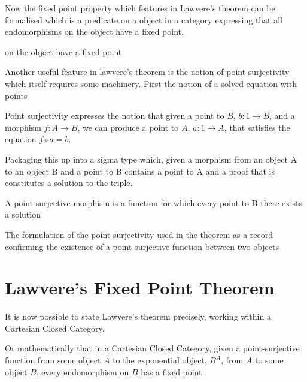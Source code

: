 
Now the fixed point property which features in Lawvere's theorem can be
formalised which is a predicate on a object in a category expressing that all
endomorphisms on the object have a fixed point.

 on the object have a fixed point.

Another useful feature in lawvere's theorem is the notion of point surjectivity
which itself requires some machinery. First the notion of a solved equation with
points


Point surjectivity expresses the notion that given a point to $B$, $b : 1
\rightarrow B$, and a morphism $f : A \rightarrow B$, we can produce a point to
$A$, $a : 1 \rightarrow A$, that satisfies the equation $f \circ a = b$.

Packaging this up into a sigma type which, given a morphism from an object A to
an object B and a point to B contains a point to A and a proof that is
constitutes a solution to the triple.


A point surjective morphism is a function for which every point to B there
exists a solution


The formulation of the point surjectivity used in the theorem as a record
confirming the existence of a point surjective function between two objects


\section{Lawvere's Fixed Point Theorem}

It is now possible to state Lawvere's theorem precisely, working within a
Cartesian Closed Category.


Or mathematically that in a Cartesian Closed Category, given a point-surjective
function from some object $A$ to the exponential object, $B^A$, from $A$ to some object
$B$, every endomorphism on $B$ has a fixed point.

